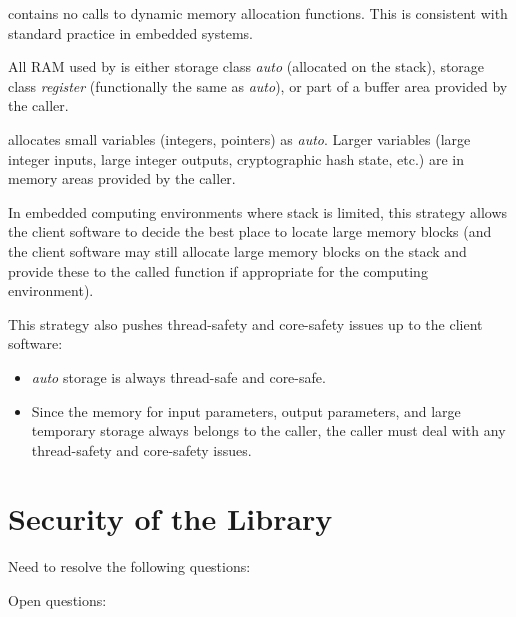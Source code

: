 \emph{\productbasenameshort{}} contains no calls to dynamic 
memory allocation functions.  This is consistent with 
standard practice in embedded systems.  

All RAM used by \emph{\productbasenameshort{}} is either 
storage class \emph{auto} (allocated on the stack), storage 
class \emph{register} (functionally the same as 
\emph{auto}), or part of a buffer area provided by the 
caller.  

\emph{\productbasenameshort{}} allocates small variables 
(integers, pointers) as \emph{auto}\@.  Larger variables 
(large integer inputs, large integer outputs, cryptographic 
hash state, etc.) are in memory areas provided by the 
caller.  

In embedded computing environments where stack is limited, 
this strategy allows the client software to decide the best 
place to locate large memory blocks (and the client software 
may still allocate large memory blocks on the stack and 
provide these to the called \emph{\productbasenameshort{}} 
function if appropriate for the computing environment).  

This strategy also pushes thread-safety and core-safety 
issues up to the client software: 

\begin{itemize}
\item \emph{auto} storage is always thread-safe and
      core-safe.
\item Since the memory for input parameters, output
      parameters, and large temporary storage always
      belongs to the caller, the caller must deal
      with any thread-safety and core-safety issues.
\end{itemize}


\section{Security of the Library}
\label{cldd0:sstl0}

Need to resolve the following questions:

Open questions:

